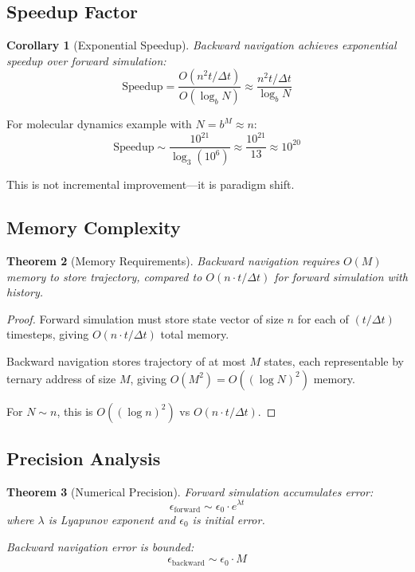\documentclass[twocolumn,10pt]{article}
\newtheorem{theorem}{Theorem}
\newtheorem{corollary}[theorem]{Corollary}
\begin{document}
\subsection{Speedup Factor}

\begin{corollary}[Exponential Speedup]
Backward navigation achieves exponential speedup over forward simulation:
\begin{equation}
\text{Speedup} = \frac{O(n^2 t/\Delta t)}{O(\log_b N)} \approx \frac{n^2 t/\Delta t}{\log_b N}
\end{equation}
\end{corollary}

For molecular dynamics example with $N = b^M \approx n$:
\begin{equation}
\text{Speedup} \sim \frac{10^{21}}{\log_3(10^6)} \approx \frac{10^{21}}{13} \approx 10^{20}
\end{equation}

This is not incremental improvement—it is paradigm shift.

\subsection{Memory Complexity}

\begin{theorem}[Memory Requirements]
Backward navigation requires $O(M)$ memory to store trajectory, compared to $O(n \cdot t/\Delta t)$ for forward simulation with history.
\end{theorem}

\begin{proof}
Forward simulation must store state vector of size $n$ for each of $(t/\Delta t)$ timesteps, giving $O(n \cdot t/\Delta t)$ total memory.

Backward navigation stores trajectory of at most $M$ states, each representable by ternary address of size $M$, giving $O(M^2) = O((\log N)^2)$ memory.

For $N \sim n$, this is $O((\log n)^2)$ vs $O(n \cdot t/\Delta t)$.
\end{proof}

\subsection{Precision Analysis}

\begin{theorem}[Numerical Precision]
Forward simulation accumulates error:
\begin{equation}
\epsilon_{\text{forward}} \sim \epsilon_0 \cdot e^{\lambda t}
\end{equation}
where $\lambda$ is Lyapunov exponent and $\epsilon_0$ is initial error.

Backward navigation error is bounded:
\begin{equation}
\epsilon_{\text{backward}} \sim \epsilon_0 \cdot M
\end{equation}
\end{theorem}
\end{document}
